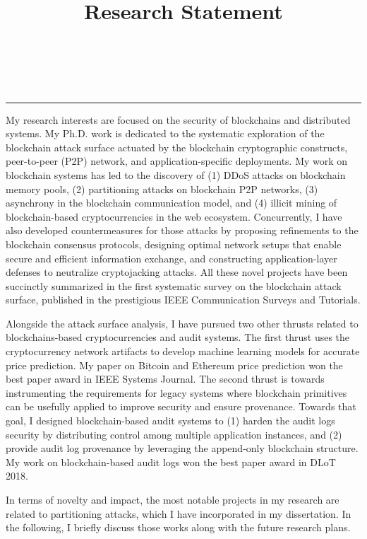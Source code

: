 \documentclass{NSF}
\begin{document}
\title{Research Statement}\\
\\\rule{\textwidth}{1.5pt}\vspace{3mm}

My research interests are focused on the security of blockchains and distributed systems. My Ph.D. work is dedicated to the systematic exploration of the blockchain attack surface actuated by the blockchain cryptographic constructs, peer-to-peer (P2P) network, and application-specific deployments. My work on blockchain systems has led to the discovery of (1) DDoS attacks on blockchain memory pools, (2) partitioning attacks on blockchain P2P networks, (3) asynchrony in the blockchain communication model, and (4) illicit mining of blockchain-based cryptocurrencies in the web ecosystem. Concurrently, I have also developed countermeasures for those attacks by proposing refinements to the blockchain consensus protocols, designing optimal network setups that enable secure and efficient information exchange, and constructing application-layer defenses to neutralize cryptojacking attacks. All these novel projects have been succinctly summarized in the first systematic survey on the blockchain attack surface, published in the prestigious IEEE Communication Surveys and Tutorials. 


Alongside the attack surface analysis, I have pursued two other thrusts related to blockchains-based cryptocurrencies and audit systems. The first thrust uses the cryptocurrency network artifacts to develop machine learning models for accurate price prediction. My paper on Bitcoin and Ethereum price prediction won the best paper award in IEEE Systems Journal. The second thrust is towards instrumenting the requirements for legacy systems where blockchain primitives can be usefully applied to improve security and ensure provenance. Towards that goal, I designed blockchain-based audit systems to (1) harden the audit logs security by distributing control among multiple application instances, and (2) provide audit log provenance by leveraging the append-only blockchain structure. My work on blockchain-based audit logs won the best paper award in DLoT 2018.   


In terms of novelty and impact, the most notable projects in my research are related to partitioning attacks, which I have incorporated in my dissertation. In the following, I briefly discuss those works along with the future research plans.  
\end{document}
